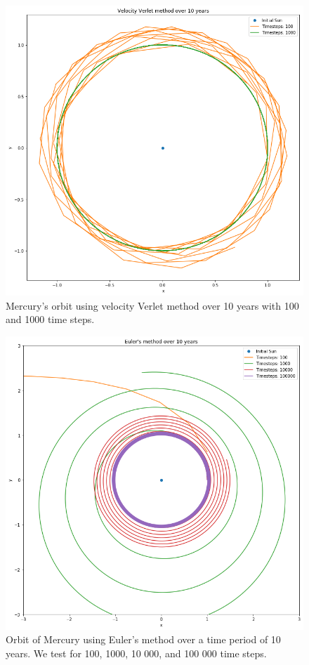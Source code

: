 \documentclass[a4paper, fontsize=11pt]{article}
\begin{document}
\begin{figure}[H]
\includegraphics[scale=0.45]{plots/velocityverlet}
\caption{Mercury's orbit using velocity Verlet method over 10 years with 100 and 1000 time steps.}
\label{fig:Verlet}
\end{figure}

\begin{figure}[H]
\includegraphics[scale=0.45]{plots/euler}
\caption{Orbit of Mercury using Euler's method over a time period of 10 years. We test for 100, 1000, 10 000, and 100 000 time steps.}
\label{fig:Euler}
\end{figure}
\end{document}
